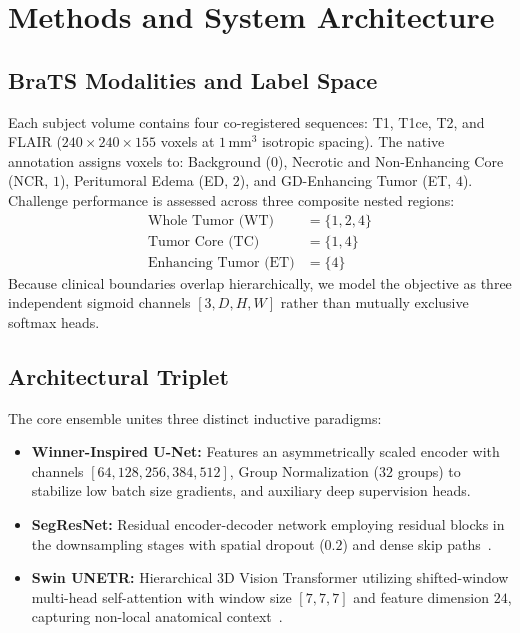 \documentclass[runningheads]{llncs}
\begin{document}
\section{Methods and System Architecture}

\subsection{BraTS Modalities and Label Space}
Each subject volume contains four co-registered sequences: T1, T1ce, T2, and FLAIR ($240 \times 240 \times 155$ voxels at $1\,\text{mm}^3$ isotropic spacing). The native annotation assigns voxels to: Background ($0$), Necrotic and Non-Enhancing Core (NCR, $1$), Peritumoral Edema (ED, $2$), and GD-Enhancing Tumor (ET, $4$). Challenge performance is assessed across three composite nested regions:
\begin{align}
    \text{Whole Tumor (WT)} &= \{1, 2, 4\} \\
    \text{Tumor Core (TC)} &= \{1, 4\} \\
    \text{Enhancing Tumor (ET)} &= \{4\}
\end{align}
Because clinical boundaries overlap hierarchically, we model the objective as three independent sigmoid channels $[3, D, H, W]$ rather than mutually exclusive softmax heads.

\subsection{Architectural Triplet}
The core ensemble unites three distinct inductive paradigms:
\begin{itemize}
    \item \textbf{Winner-Inspired U-Net:} Features an asymmetrically scaled encoder with channels $[64, 128, 256, 384, 512]$, Group Normalization ($32$ groups) to stabilize low batch size gradients, and auxiliary deep supervision heads.
    \item \textbf{SegResNet:} Residual encoder-decoder network employing residual blocks in the downsampling stages with spatial dropout ($0.2$) and dense skip paths~\cite{myronenko20183d}.
    \item \textbf{Swin UNETR:} Hierarchical 3D Vision Transformer utilizing shifted-window multi-head self-attention with window size $[7, 7, 7]$ and feature dimension $24$, capturing non-local anatomical context~\cite{hatamizadeh2022swin}.
\end{itemize}
\end{document}
